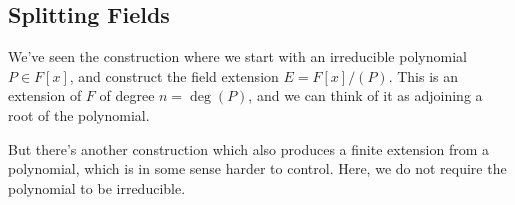 



\subsection{Splitting Fields}

We've seen the construction where we start with an irreducible polynomial $P \in F[x]$, and construct the field extension $E = F[x]/(P)$. This is an extension of $F$ of degree $n = \deg(P)$, and we can think of it as adjoining a root of the polynomial. 

But there's another construction which also produces a finite extension from a polynomial, which is in some sense harder to control. Here, we do not require the polynomial to be irreducible. 

